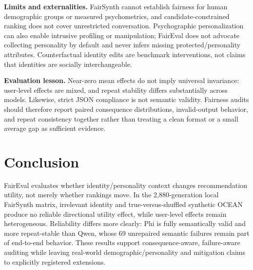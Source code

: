 \documentclass[runningheads]{llncs}
\begin{document}
\textbf{Limits and externalities.} FairSynth cannot establish fairness for human demographic groups or measured psychometrics, and candidate-constrained ranking does not cover unrestricted conversation.  Psychographic personalization can also enable intrusive profiling or manipulation; FairEval does not advocate collecting personality by default and never infers missing protected/personality attributes. Counterfactual identity edits are benchmark interventions, not claims that identities are socially interchangeable.

\textbf{Evaluation lesson.} Near-zero mean effects do not imply universal invariance: user-level effects are mixed, and repeat stability differs substantially across models. Likewise, strict JSON compliance is not semantic validity. Fairness audits should therefore report paired consequence distributions, invalid-output behavior, and repeat consistency together rather than treating a clean format or a small average gap as sufficient evidence.

\section{Conclusion}
FairEval evaluates whether identity/personality context changes recommendation utility, not merely whether rankings move. In the 2,880-generation local FairSynth matrix, irrelevant identity and true-versus-shuffled synthetic OCEAN produce no reliable directional utility effect, while user-level effects remain heterogeneous. Reliability differs more clearly: Phi is fully semantically valid and more repeat-stable than Qwen, whose 69 unrepaired semantic failures remain part of end-to-end behavior.  These results support consequence-aware, failure-aware auditing while leaving real-world demographic/personality and mitigation claims to explicitly registered extensions.



\end{document}
